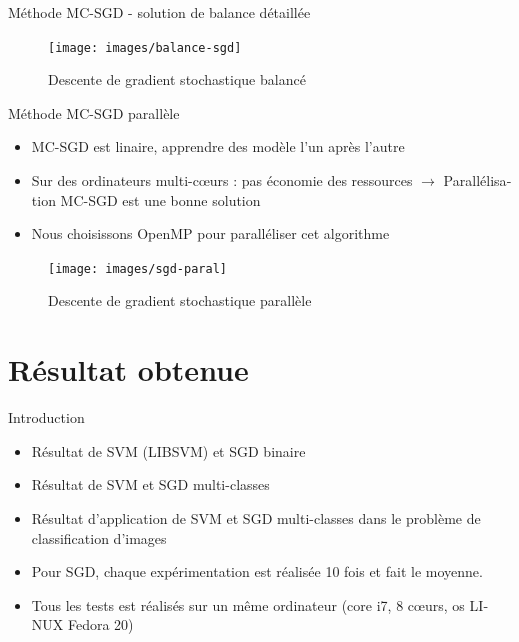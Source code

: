 \documentclass[11pt]{beamer}
\begin{document}
\begin{otherlanguage}{french}
\begin{frame}{Méthode MC-SGD - solution de balance détaillée}
\begin{figure}[ht!]
\centering
\texttt{[image: images/balance-sgd]}
\caption{Descente de gradient stochastique balancé}
\label{al:balance-sgd}
\end{figure}
\end{frame}


\begin{frame}{Méthode MC-SGD parallèle}
\begin{itemize}
\item MC-SGD est linaire, apprendre des modèle l'un après l'autre
\item Sur des ordinateurs multi-cœurs : pas économie des ressources
$\rightarrow$ Parallélisation MC-SGD est une bonne solution
\item Nous choisissons OpenMP pour paralléliser cet algorithme
\end{itemize}
\end{frame}


\begin{frame}
\begin{figure}[ht!]
\centering
\texttt{[image: images/sgd-paral]}
\caption{Descente de gradient stochastique parallèle}
\label{al:sgd-paral}
\end{figure}
\end{frame}


\section{Résultat obtenue}
\begin{frame}{Introduction}

\begin{itemize}
\item Résultat de SVM (LIBSVM) et SGD binaire
\item Résultat de SVM et SGD multi-classes
\item Résultat d'application de SVM et SGD multi-classes dans le problème de classification d'images
\item Pour SGD, chaque expérimentation est réalisée 10 fois et fait le moyenne.
\item Tous les tests est réalisés sur un même ordinateur (core i7, 8 cœurs, os LINUX Fedora 20)
\end{itemize}


\end{frame}
\end{otherlanguage}
\end{document}
